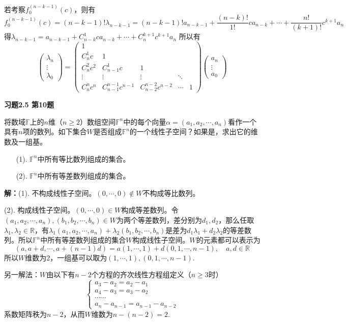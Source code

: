 若考察$f_0^{(n-k-1)}(c)$，则有
$$
f_0^{(n-k-1)}(c) = (n-k-1)!\lambda_{n-k-1} = (n-k-1)!a_{n-k-1} + \dfrac{(n-k)!}{1!} c a_{n-k} + \cdots + \dfrac{n!}{(k+1)!} c^{k+1} a_{n}
$$
得$\lambda_{n-k-1} = a_{n-k-1} + C_{n-k}^1c a_{n-k} + \cdots + C_{n}^{k+1}c^{k+1} a_{n}$
所以有
$$
\begin{pmatrix} \lambda_n \\ \vdots \\ \lambda_0 \end{pmatrix}
= \begin{pmatrix} 1 & & & & \\ C_{n}^1c & 1 & & & \\ C_{n}^2c^2 & C_{n-1}^1c & 1 & & \\ \vdots & \vdots & \vdots & \ddots & \\ C_{n}^nc^n & C_{n-1}^{n-1}c^{n-1} & C_{n-2}^{n-2}c^{n-2} & \cdots & 1 \end{pmatrix}
\begin{pmatrix} a_n \\ \vdots \\ a_0 \end{pmatrix}
$$

\newpageorvspace

{\bf 习题2.5 第10题}

将数域$\mathbb{F}$上的$n$维（$n\geqslant 2$）数组空间$\mathbb{F}^n$中的每个向量$\alpha = (a_1,a_2,\cdots,a_n)$看作一个具有$n$项的数列。如下集合$W$是否组成$\mathbb{F}^n$的一个线性子空间？如果是，求出它的维数及一组基。
\begin{itemize}
\item[(1).] $\mathbb{F}^n$中所有等比数列组成的集合。
\item[(2).] $\mathbb{F}^n$中所有等差数列组成的集合。
\end{itemize}

{\bf 解：}(1). 不构成线性子空间。$(0,\cdots,0)\not\in W$不构成等比数列。

(2). 构成线性子空间。$(0,\cdots,0)\in W$构成等差数列。令$(a_1,a_2,\cdots,a_n), (b_1,b_2,\cdots,b_n)\in W$为两个等差数列，差分别为$d_1, d_2$，那么任取$\lambda_1, \lambda_2 \in \mathbb{R}$，有$\lambda_1(a_1,a_2,\cdots,a_n) + \lambda_2(b_1,b_2,\cdots,b_n)$是差为$d_1\lambda_1 + d_2\lambda_2$的等差数列。所以$\mathbb{F}^n$中所有等差数列组成的集合$W$构成线性子空间。$W$的元素都可以表示为
$$(a,a+d,\cdots,a+(n-1)d) = a(1,\cdots,1) + d(0,1,\cdots,n-1), \quad a,d\in\mathbb{R}$$
所以$W$维数为2，一组基可以取为$(1,\cdots,1), (0,1,\cdots,n-1)$.

另一解法：$W$由以下有$n-2$个方程的齐次线性方程组定义（$n\geqslant 3$时）
$$\begin{cases}
a_3-a_2 = a_2-a_1 \\
a_4-a_3 = a_3-a_2 \\
\cdots\cdots \\
a_n-a_{n-1} = a_{n-1}-a_{n-2}
\end{cases}$$
系数矩阵秩为$n-2$，从而$W$维数为$n-(n-2)=2$.

